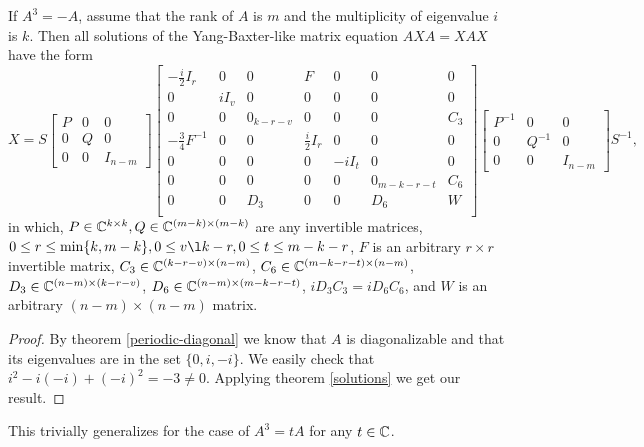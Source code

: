 \documentclass{article}
\begin{document}
\begin{theorem}
  If $A^3 = -A$, assume that the rank of $A$ is $m$ and the multiplicity of eigenvalue $i$ is $k$.
  Then all solutions of the Yang-Baxter-like matrix equation $A X A = X A X$ have the form
  \[X = S \begin{bmatrix} P & 0 & 0\\ 0 & Q & 0\\ 0 & 0 & I_{n - m} \end{bmatrix} \left[ \begin{array}{ccc|ccc|c} - \frac{i}{2} I_r & 0 & 0 & F & 0 & 0 & 0 \\ 0 & i I_v & 0 & 0 & 0 & 0 & 0 \\ 0 & 0 & 0_{k - r - v} & 0 & 0 & 0 & C_3 \\ \hline - \frac{3}{4} F^{-1} & 0 & 0 & \frac{i}{2} I_r & 0 & 0 & 0 \\ 0 & 0 & 0 & 0 & - i I_t & 0 & 0 \\ 0 & 0 & 0 & 0 & 0 & 0_{m - k - r - t} & C_6 \\ \hline 0 & 0 & D_3 & 0 & 0 & D_6 & W \\ \end{array} \right] \begin{bmatrix} P^{-1} & 0 & 0\\ 0 & Q^{-1} & 0\\ 0 & 0 & I_{n - m} \end{bmatrix} S^{-1},\]
  in which, $P \in \mathbb{C}^{k \times k}, Q \in \mathbb{C}^{(m - k) \times (m - k)}$ are any invertible matrices, $0 \le r \le \min \{k, m - k\}, 0 \le v \l k - r, 0 \le t \le m - k - r$, $F$ is an arbitrary $r \times r$ invertible matrix, $C_3 \in \mathbb{C}^{(k - r - v) \times (n - m)}$, $C_6 \in \mathbb{C}^{(m - k - r - t) \times (n - m)}$, $D_3 \in \mathbb{C}^{(n - m) \times (k - r - v)}$, $D_6 \in \mathbb{C}^{(n - m) \times (m - k - r - t)}$, $i D_3 C_3 = i D_6 C_6$, and $W$ is an arbitrary $(n - m) \times (n - m)$ matrix.
\end{theorem}

\begin{proof}
  By theorem \ref{periodic-diagonal} we know that $A$ is diagonalizable and that its eigenvalues are in the set $\{0, i, - i\}$.
  We easily check that $i^2 - i (- i) + (- i)^2 = -3 \neq 0$.
  Applying theorem \ref{solutions} we get our result.
\end{proof}

\begin{remark}
This trivially generalizes for the case of $A^3 = t A$ for any $t \in \mathbb{C}$.
\end{remark}
\end{document}
